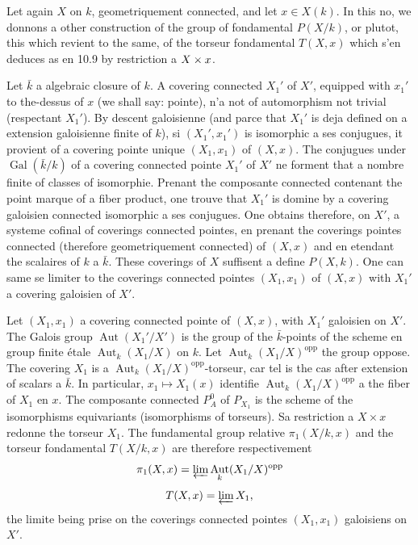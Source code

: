 \documentclass[12pt,a4paper]{article}
\theoremstyle{plain}
\theoremstyle{definition}
\theoremstyle{remark}
\DeclareMathOperator{\Gal}{Gal}
\DeclareMathOperator{\Aut}{Aut}
\begin{document}
Let again $X$ on $k$, geometriquement connected, and let $x \in X(k)$. In this no, we donnons a other construction of the group of fondamental $P(X/k)$, or plutot, this which revient to the same, of the torseur fondamental $T(X, x)$ which s'en deduces as en 10.9 by restriction a $X \times \\{x\\}$.

Let $\bar{k}$ a algebraic closure of $k$. A covering connected $X_1'$ of $X'$, equipped with $x_1'$ to the-dessus of $x$ (we shall say: pointe), n'a not of automorphism not trivial (respectant $X_1'$). By descent galoisienne (and parce that $X_1'$ is deja defined on a extension galoisienne finite of $k$), si $(X_1', x_1')$ is isomorphic a ses conjugues, it provient of a covering pointe unique $(X_1, x_1)$ of $(X, x)$. The conjugues under $\Gal(\bar{k}/k)$ of a covering connected pointe $X_1'$ of $X'$ ne forment that a nombre finite of classes of isomorphie. Prenant the composante connected contenant the point marque of a fiber product, one trouve that $X_1'$ is domine by a covering galoisien connected isomorphic a ses conjugues. One obtains therefore, on $X'$, a systeme cofinal of coverings connected pointes, en prenant the coverings pointes connected (therefore geometriquement connected) of $(X, x)$ and en etendant the scalaires of $k$ a $\bar{k}$. These coverings of $X$ suffisent a define $P(X, k)$. One can same se limiter to the coverings connected pointes $(X_1, x_1)$ of $(X, x)$ with $X_1'$ a covering galoisien of $X'$.

Let $(X_1, x_1)$ a covering connected pointe of $(X, x)$, with $X_1'$ galoisien on $X'$. The Galois group $\Aut(X_1'/X')$ is the group of the $\bar{k}$-points of the scheme en group finite étale $\Aut_k(X_1/X)$ on $k$. Let $\Aut_k(X_1/X)^{\mathrm{opp}}$ the group oppose. The covering $X_1$ is a $\Aut_k(X_1/X)^{\mathrm{opp}}$-torseur, car tel is the cas after extension of scalars a $\bar{k}$. In particular, $x_1 \mapsto X_1(x)$ identifie $\Aut_k(X_1/X)^{\mathrm{opp}}$ a the fiber of $X_1$ en $x$. The composante connected $P_A^0$ of $P_{X_1}$ is the scheme of the isomorphisms equivariants (isomorphisms of torseurs). Sa restriction a $X \times x$ redonne the torseur $X_1$. The fundamental group relative $\pi_1(X/k, x)$ and the torseur fondamental $T(X/k, x)$ are therefore respectivement
$$\pi_1(X, x) = \varprojlim \Aut_k(X_1/X)^{\mathrm{opp}}$$
$$T(X, x) = \varprojlim X_1,$$
the limite being prise on the coverings connected pointes $(X_1, x_1)$ galoisiens on $X'$.
\end{document}
